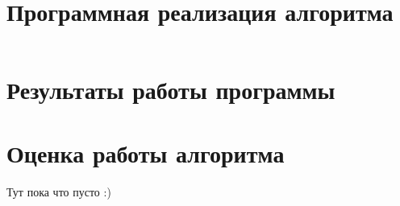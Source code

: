 \documentclass[bachelor, och, labwork]{shiza}
\begin{document}
\section{Программная реализация алгоритма}

\inputminted[linenos,breaklines=true, fontsize=\small, style=bw]{python}{1.py}

\section{Результаты работы программы}

\section{Оценка работы алгоритма}

Тут пока что пусто :)





\end{document}
